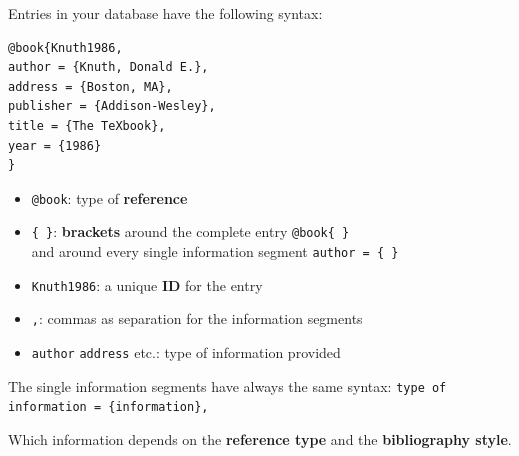\begin{frame}[fragile]


Entries in your database have the following syntax:


\begin{lstlisting}
@book{Knuth1986,
author = {Knuth, Donald E.},
address = {Boston, MA},
publisher = {Addison-Wesley},
title = {The TeXbook},
year = {1986}
}
\end{lstlisting}

%

\begin{itemize}
	\item \lstinline|@book|: type of \textbf{reference}
	\item \lstinline|{ }|: \textbf{brackets} around the complete entry \lstinline|@book{ }|\\
	and around every single information segment \lstinline|author = { }|
	
	\item \lstinline|Knuth1986|: a unique \textbf{ID} for the entry
	\item \lstinline|,|: commas as separation for the information segments
	\item \lstinline|author| \lstinline|address| etc.: type of information provided
\end{itemize}

The single information segments have always the same syntax: \lstinline|type of information = {information},|

\smallskip 

Which information depends on the \textbf{reference type} and the \textbf{bibliography style}.
\end{frame}


%
%
%
%
%
%
%


